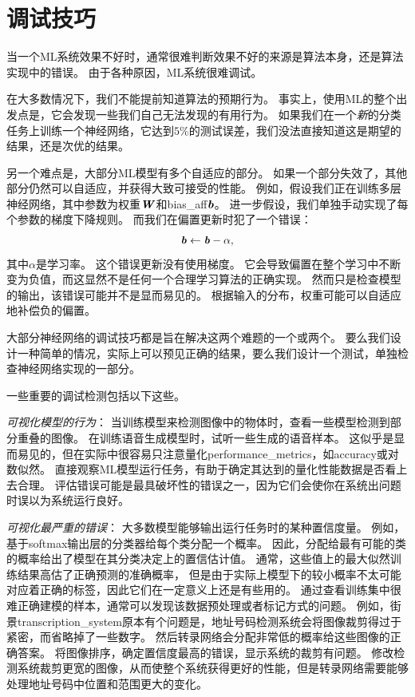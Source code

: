 \section{调试技巧}
\label{sec:debugging_strategies}
当一个\gls{ML}系统效果不好时，通常很难判断效果不好的来源是算法本身，还是算法实现中的错误。
由于各种原因，\gls{ML}系统很难调试。

在大多数情况下，我们不能提前知道算法的预期行为。
事实上，使用\gls{ML}的整个出发点是，它会发现一些我们自己无法发现的有用行为。
如果我们在一个\emph{新}的分类任务上训练一个神经网络，它达到$5\%$的测试误差，我们没法直接知道这是期望的结果，还是次优的结果。

另一个难点是，大部分\gls{ML}模型有多个自适应的部分。
如果一个部分失效了，其他部分仍然可以自适应，并获得大致可接受的性能。
例如，假设我们正在训练多层神经网络，其中参数为权重$\boldsymbol{\mathit{W}}$和\gls{bias_aff}$\boldsymbol{\mathit{b}}$。
进一步假设，我们单独手动实现了每个参数的梯度下降规则。
而我们在偏置更新时犯了一个错误：
\begin{equation}
	\boldsymbol{\mathit{b}} \leftarrow \boldsymbol{\mathit{b}} - \alpha,
\end{equation}
其中$\alpha$是学习率。
这个错误更新没有使用梯度。
它会导致偏置在整个学习中不断变为负值，而这显然不是任何一个合理学习算法的正确实现。
然而只是检查模型的输出，该错误可能并不是显而易见的。
根据输入的分布，权重可能可以自适应地补偿负的偏置。


大部分神经网络的调试技巧都是旨在解决这两个难题的一个或两个。
要么我们设计一种简单的情况，实际上可以预见正确的结果，要么我们设计一个测试，单独检查神经网络实现的一部分。

一些重要的调试检测包括以下这些。

\emph{可视化模型的行为}：
当训练模型来检测图像中的物体时，查看一些模型检测到部分重叠的图像。
在训练语音生成模型时，试听一些生成的语音样本。
这似乎是显而易见的，但在实际中很容易只注意量化\gls{performance_metrics}，如\gls{accuracy}或对数似然。
直接观察\gls{ML}模型运行任务，有助于确定其达到的量化性能数据是否看上去合理。
评估错误可能是最具破坏性的错误之一，因为它们会使你在系统出问题时误以为系统运行良好。

\emph{可视化最严重的错误}：
大多数模型能够输出运行任务时的某种置信度量。
例如，基于\gls{softmax}输出层的分类器给每个类分配一个概率。
因此，分配给最有可能的类的概率给出了模型在其分类决定上的置信估计值。
通常，这些值上的最大似然训练结果高估了正确预测的准确概率，
但是由于实际上模型下的较小概率不太可能对应着正确的标签，因此它们在一定意义上还是有些用的。
通过查看训练集中很难正确建模的样本，通常可以发现该数据预处理或者标记方式的问题。
例如，街景\gls{transcription_system}原本有个问题是，地址号码检测系统会将图像裁剪得过于紧密，而省略掉了一些数字。
然后转录网络会分配非常低的概率给这些图像的正确答案。
将图像排序，确定置信度最高的错误，显示系统的裁剪有问题。
修改检测系统裁剪更宽的图像，从而使整个系统获得更好的性能，但是转录网络需要能够处理地址号码中位置和范围更大的变化。

